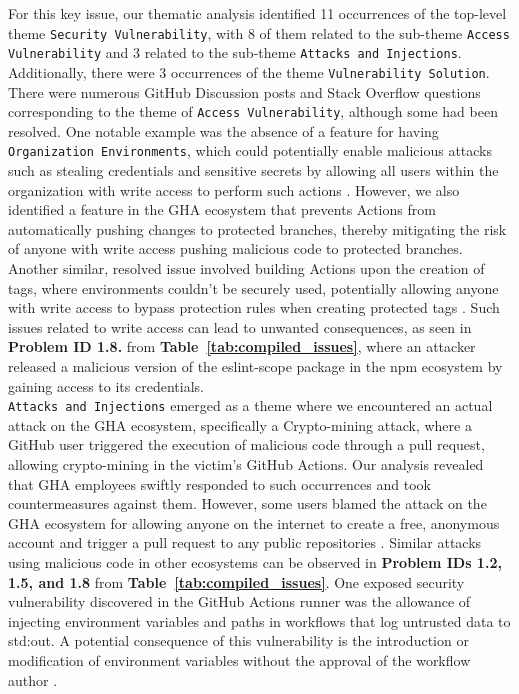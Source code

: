 \documentclass[conference]{IEEEtran}
\begin{document}
	For this key issue, our thematic analysis identified 11 occurrences of the top-level theme \texttt{Security Vulnerability}, with 8 of them related to the sub-theme \texttt{Access Vulnerability} and 3 related to the sub-theme \texttt{Attacks and Injections}. Additionally, there were 3 occurrences of the theme \texttt{Vulnerability Solution}.\\
	There were numerous GitHub Discussion posts and Stack Overflow questions corresponding to the theme of \texttt{Access Vulnerability}, although some had been resolved. One notable example was the absence of a feature for having \texttt{Organization Environments}, which could potentially enable malicious attacks such as stealing credentials and sensitive secrets by allowing all users within the organization with write access to perform such actions \cite{philomory2024}. However, we also identified a feature in the GHA ecosystem that prevents Actions from automatically pushing changes to protected branches, thereby mitigating the risk of anyone with write access pushing malicious code to protected branches\cite{robozevel2024}. Another similar, resolved issue involved building Actions upon the creation of tags, where environments couldn't be securely used, potentially allowing anyone with write access to bypass protection rules when creating protected tags \cite{WolfspiritM2024}. Such issues related to write access can lead to unwanted consequences, as seen in \textbf{Problem ID 1.8.} from \textbf{Table~\ref{tab:compiled_issues}}, where an attacker released a malicious version of the eslint-scope package in the npm ecosystem by gaining access to its credentials.\\
	\texttt{Attacks and Injections} emerged as a theme where we encountered an actual attack on the GHA ecosystem, specifically a Crypto-mining attack, where a GitHub user triggered the execution of malicious code through a pull request, allowing crypto-mining in the victim's GitHub Actions. Our analysis revealed that GHA employees swiftly responded to such occurrences and took countermeasures against them. However, some users blamed the attack on the GHA ecosystem for allowing anyone on the internet to create a free, anonymous account and trigger a pull request to any public repositories \cite{thibaultduponchelle2024}. Similar attacks using malicious code in other ecosystems can be observed in \textbf{Problem IDs 1.2, 1.5, and 1.8} from \textbf{Table~\ref{tab:compiled_issues}}. One exposed security vulnerability discovered in the GitHub Actions runner was the allowance of injecting environment variables and paths in workflows that log untrusted data to std:out. A potential consequence of this vulnerability is the introduction or modification of environment variables without the approval of the workflow author \cite{DaanDeMeyer2024}.
\end{document}
